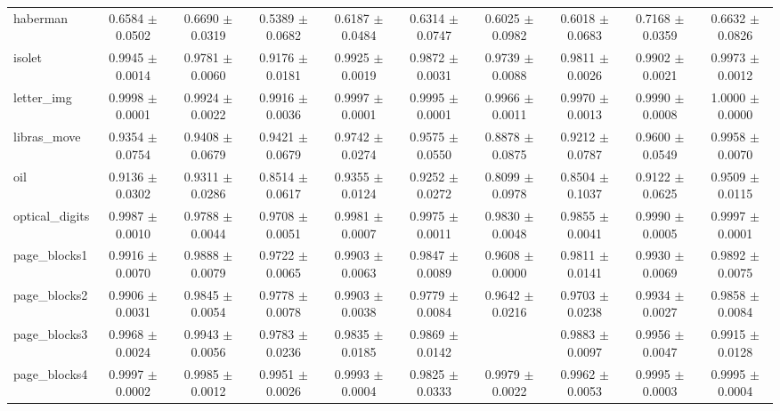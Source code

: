 \begin{table*}[htbp]
\begin{tabular}{lccccccccc}
            haberman & 0.6584 $\pm$ 0.0502 & 0.6690 $\pm$ 0.0319 & 0.5389 $\pm$ 0.0682 & 0.6187 $\pm$ 0.0484 & 0.6314 $\pm$ 0.0747 & 0.6025 $\pm$ 0.0982 & 0.6018 $\pm$ 0.0683 & 0.7168 $\pm$ 0.0359 & 0.6632 $\pm$ 0.0826 \\ 
            isolet & 0.9945 $\pm$ 0.0014 & 0.9781 $\pm$ 0.0060 & 0.9176 $\pm$ 0.0181 & 0.9925 $\pm$ 0.0019 & 0.9872 $\pm$ 0.0031 & 0.9739 $\pm$ 0.0088 & 0.9811 $\pm$ 0.0026 & 0.9902 $\pm$ 0.0021 & 0.9973 $\pm$ 0.0012 \\ 
            letter\_img & 0.9998 $\pm$ 0.0001 & 0.9924 $\pm$ 0.0022 & 0.9916 $\pm$ 0.0036 & 0.9997 $\pm$ 0.0001 & 0.9995 $\pm$ 0.0001 & 0.9966 $\pm$ 0.0011 & 0.9970 $\pm$ 0.0013 & 0.9990 $\pm$ 0.0008 & 1.0000 $\pm$ 0.0000 \\ 
            libras\_move & 0.9354 $\pm$ 0.0754 & 0.9408 $\pm$ 0.0679 & 0.9421 $\pm$ 0.0679 & 0.9742 $\pm$ 0.0274 & 0.9575 $\pm$ 0.0550 & 0.8878 $\pm$ 0.0875 & 0.9212 $\pm$ 0.0787 & 0.9600 $\pm$ 0.0549 & 0.9958 $\pm$ 0.0070 \\ 
            oil & 0.9136 $\pm$ 0.0302 & 0.9311 $\pm$ 0.0286 & 0.8514 $\pm$ 0.0617 & 0.9355 $\pm$ 0.0124 & 0.9252 $\pm$ 0.0272 & 0.8099 $\pm$ 0.0978 & 0.8504 $\pm$ 0.1037 & 0.9122 $\pm$ 0.0625 & 0.9509 $\pm$ 0.0115 \\ 
            optical\_digits & 0.9987 $\pm$ 0.0010 & 0.9788 $\pm$ 0.0044 & 0.9708 $\pm$ 0.0051 & 0.9981 $\pm$ 0.0007 & 0.9975 $\pm$ 0.0011 & 0.9830 $\pm$ 0.0048 & 0.9855 $\pm$ 0.0041 & 0.9990 $\pm$ 0.0005 & 0.9997 $\pm$ 0.0001 \\ 
            page\_blocks1 & 0.9916 $\pm$ 0.0070 & 0.9888 $\pm$ 0.0079 & 0.9722 $\pm$ 0.0065 & 0.9903 $\pm$ 0.0063 & 0.9847 $\pm$ 0.0089 & 0.9608 $\pm$ 0.0000 & 0.9811 $\pm$ 0.0141 & 0.9930 $\pm$ 0.0069 & 0.9892 $\pm$ 0.0075 \\ 
            page\_blocks2 & 0.9906 $\pm$ 0.0031 & 0.9845 $\pm$ 0.0054 & 0.9778 $\pm$ 0.0078 & 0.9903 $\pm$ 0.0038 & 0.9779 $\pm$ 0.0084 & 0.9642 $\pm$ 0.0216 & 0.9703 $\pm$ 0.0238 & 0.9934 $\pm$ 0.0027 & 0.9858 $\pm$ 0.0084 \\ 
            page\_blocks3 & 0.9968 $\pm$ 0.0024 & 0.9943 $\pm$ 0.0056 & 0.9783 $\pm$ 0.0236 & 0.9835 $\pm$ 0.0185 & 0.9869 $\pm$ 0.0142 &  & 0.9883 $\pm$ 0.0097 & 0.9956 $\pm$ 0.0047 & 0.9915 $\pm$ 0.0128 \\ 
            page\_blocks4 & 0.9997 $\pm$ 0.0002 & 0.9985 $\pm$ 0.0012 & 0.9951 $\pm$ 0.0026 & 0.9993 $\pm$ 0.0004 & 0.9825 $\pm$ 0.0333 & 0.9979 $\pm$ 0.0022 & 0.9962 $\pm$ 0.0053 & 0.9995 $\pm$ 0.0003 & 0.9995 $\pm$ 0.0004 \\ 

\end{tabular}
\end{table*}
